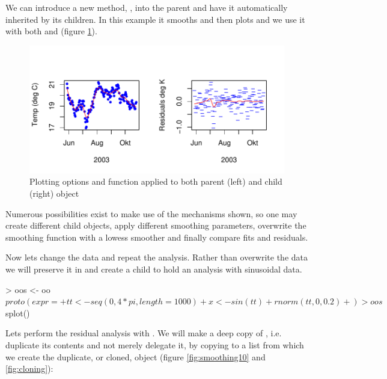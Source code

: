 \documentclass{Z}
\begin{document}
We can introduce a new method, , into
the parent  and have it automatically
inherited by its children.  In this example
it smooths and then plots and we use it with
both  and  (figure \ref{fig:smoothing06}).




\begin{figure}[tbp]
\begin{center}
\includegraphics[width=\textwidth]{proto-smoothing06}
\caption{Plotting options and  function applied
to both parent (left) and child (right) object}
\label{fig:smoothing06}
\end{center}
\end{figure}

Numerous possibilities exist to make use of the
mechanisms shown, so one may create different child objects, apply
different smoothing parameters, overwrite the smoothing function with
a lowess smoother and finally compare fits and residuals.

Now lets change the data and repeat the analysis.  Rather than 
overwrite the data we will preserve it in  and create a child
 to hold an analysis with sinusoidal data.

\begin{Schunk}
\begin{Sinput}
> oos <- oo$proto(expr = {
+     tt <- seq(0, 4 * pi, length = 1000)
+     x <- sin(tt) + rnorm(tt, 0, 0.2)
+ })
> oos$splot()
\end{Sinput}
\end{Schunk}

Lets perform the residual analysis with .  
We will make a deep copy of , i.e. duplicate its
contents and not merely delegate it, by copying 
to a list from which we create the duplicate, or cloned, 
 object (figure \ref{fig:smoothing10} and \ref{fig:cloning}):
\end{document}
